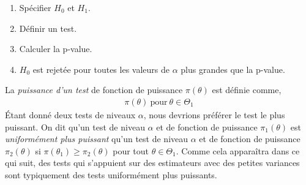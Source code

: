 \documentclass[10pt, reqno]{amsart}
\begin{document}
\begin{enumerate}
\item Spécifier $H_0$ et $H_1$.
\item Définir un test.
\item Calculer la p-value.
\item $H_0$ est rejetée pour toutes les valeurs de $\alpha$ plus grandes que la p-value.
\end{enumerate}
La \emph{puissance d'un test} de fonction de puissance $\pi(\theta)$ est définie comme,
\begin{align*}
\pi(\theta) \ \textrm{pour} \ \theta \in \Theta_1
\end{align*}
\'Etant donné deux tests de niveaux $\alpha$, nous devrions préférer le test le plus puissant. On dit qu'un test de niveau $\alpha$ et de fonction de puissance $\pi_1(\theta)$ est \emph{uniformément plus puissant} qu'un test de niveau $\alpha$ et de fonction de puissance $\pi_2(\theta)$ si $\pi(\theta_1) \geq \pi_2(\theta)$ pour tout $\theta\in \Theta_1$. Comme cela apparaîtra dans ce qui suit, des tests qui s'appuient sur des estimateurs avec des petites variances sont typiquement des tests uniformément plus puissants.
\end{document}
